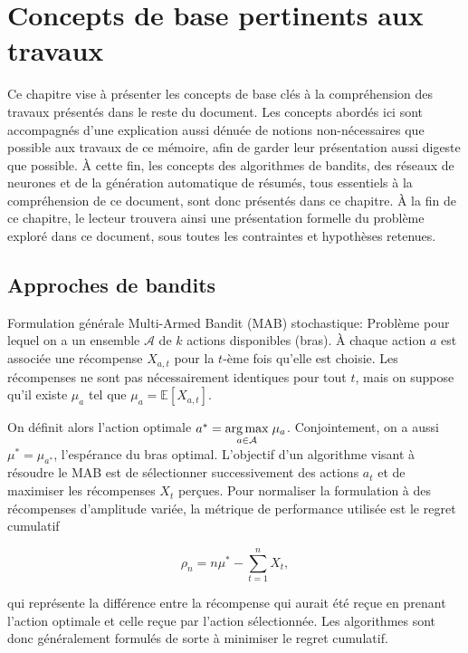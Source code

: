 \chapter{Concepts de base pertinents aux travaux}     %
\label{chap:prerequis}                   %

Ce chapitre vise à présenter les concepts de base clés à la compréhension des travaux
présentés dans le reste du document.
Les concepts abordés ici sont accompagnés d'une explication aussi dénuée de notions
non-nécessaires que possible aux travaux de ce mémoire, afin de garder leur présentation
aussi digeste que possible.
À cette fin, les concepts des algorithmes de bandits, des réseaux de neurones et de la
génération automatique de résumés, tous essentiels à la compréhension de ce document,
sont donc présentés dans ce chapitre.
À la fin de ce chapitre, le lecteur trouvera ainsi une présentation formelle du
problème exploré dans ce document, sous toutes les contraintes et hypothèses retenues.

\section{Approches de bandits}

Formulation générale Multi-Armed Bandit (MAB) stochastique: Problème pour lequel on a un ensemble
$\mathcal{A}$ de $k$ actions disponibles (bras).
À chaque action $a$ est associée une récompense $X_{a,t}$ pour la $t$-ème fois qu'elle
est choisie.
Les récompenses ne sont pas nécessairement identiques pour tout $t$, mais on suppose
qu'il existe $\mu_a$ tel que $\mu_a = \mathbb{E} \left[X_{a,t} \right]$.

On définit alors l'action optimale $a^* = \underset{a \in \mathcal{A}}{\operatorname*{arg\,max}} \; \mu_a$.
Conjointement, on a aussi $\mu^* = \mu_{a^*}$, l'espérance du bras optimal.
L'objectif d'un algorithme visant à résoudre le MAB est de sélectionner
successivement des actions $a_t$ et de maximiser les récompenses $X_t$ perçues.
Pour normaliser la formulation à des récompenses d'amplitude variée, la métrique de performance
utilisée est le regret cumulatif

\begin{equation}
    \rho_n = n \mu^* -  \sum_{t=1}^n  X_t,
    \label{eq:regret_cumulatif}
\end{equation}

qui représente la différence entre la récompense qui aurait été reçue en prenant
l'action optimale et celle reçue par l'action sélectionnée.
Les algorithmes sont donc généralement formulés de sorte à minimiser le regret cumulatif.

